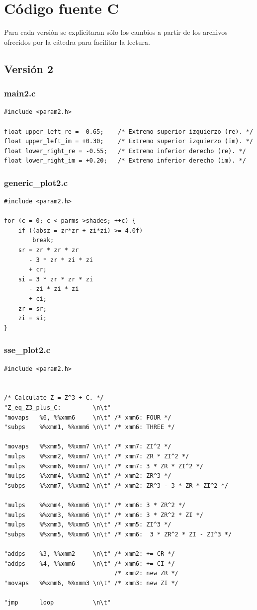 \documentclass[a4paper,10pt]{article}
\begin{document}
\section{C\'odigo fuente C}
Para cada versión se explicitaran sólo los cambios a partir de los archivos ofrecidos por la cátedra para facilitar la lectura.

\subsection{Versión 2}
\subsubsection{main2.c}
\begin{verbatim}
#include <param2.h>

float upper_left_re = -0.65;	/* Extremo superior izquierzo (re). */
float upper_left_im = +0.30;	/* Extremo superior izquierzo (im). */
float lower_right_re = -0.55;	/* Extremo inferior derecho (re). */
float lower_right_im = +0.20;	/* Extremo inferior derecho (im). */
\end{verbatim}

\subsubsection{generic\_plot2.c}
\begin{verbatim}
#include <param2.h>

for (c = 0; c < parms->shades; ++c) {
	if ((absz = zr*zr + zi*zi) >= 4.0f)
		break;
	sr = zr * zr * zr
	   - 3 * zr * zi * zi
	   + cr;
	si = 3 * zr * zr * zi
	   - zi * zi * zi
	   + ci;
	zr = sr;
	zi = si;
}
\end{verbatim}
\subsubsection{sse\_plot2.c}
\begin{verbatim}
#include <param2.h>


/* Calculate Z = Z^3 + C. */
"Z_eq_Z3_plus_C:         \n\t"
"movaps   %6, %%xmm6     \n\t" /* xmm6: FOUR */
"subps    %%xmm1, %%xmm6 \n\t" /* xmm6: THREE */

"movaps   %%xmm5, %%xmm7 \n\t" /* xmm7: ZI^2 */
"mulps    %%xmm2, %%xmm7 \n\t" /* xmm7: ZR * ZI^2 */
"mulps    %%xmm6, %%xmm7 \n\t" /* xmm7: 3 * ZR * ZI^2 */
"mulps    %%xmm4, %%xmm2 \n\t" /* xmm2: ZR^3 */
"subps    %%xmm7, %%xmm2 \n\t" /* xmm2: ZR^3 - 3 * ZR * ZI^2 */

"mulps    %%xmm4, %%xmm6 \n\t" /* xmm6: 3 * ZR^2 */
"mulps    %%xmm3, %%xmm6 \n\t" /* xmm6: 3 * ZR^2 * ZI */
"mulps    %%xmm3, %%xmm5 \n\t" /* xmm5: ZI^3 */
"subps    %%xmm5, %%xmm6 \n\t" /* xmm6:  3 * ZR^2 * ZI - ZI^3 */

"addps    %3, %%xmm2     \n\t" /* xmm2: += CR */
"addps    %4, %%xmm6     \n\t" /* xmm6: += CI */
							   /* xmm2: new ZR */
"movaps   %%xmm6, %%xmm3 \n\t" /* xmm3: new ZI */

"jmp      loop           \n\t"
\end{verbatim}
\end{document}
